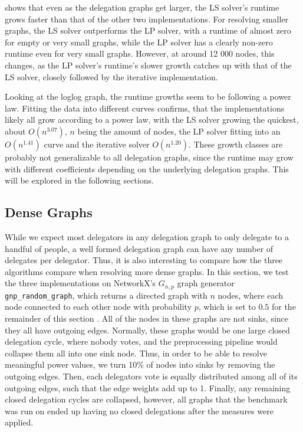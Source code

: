  shows that even as the delegation graphs get larger, the LS solver's runtime grows faster than that of the other two implementations. For resolving smaller graphs, the LS solver outperforms the LP solver, with a runtime of almost zero for empty or very small graphs, while the LP solver has a clearly non-zero runtime even for very small graphs. However, at around 12 000 nodes, this changes, as the LP solver's runtime's slower growth catches up with that of the LS solver, closely followed by the iterative implementation. 

Looking at the loglog graph, the runtime growths seem to be following a power law. Fitting the data into different curves confirms, that the implementations likely all grow according to a power law, with the LS solver growing the quickest, about $O(n^{3.07})$, $n$ being the amount of nodes, the LP solver fitting into an $O(n^{1.41})$ curve and the iterative solver $O(n^{1.20})$. These growth classes are probably not generalizable to all delegation graphs, since the runtime may grow with different coefficients depending on the underlying delegation graphs. This will be explored in the following sections.


\subsection{Dense Graphs}

While we expect most delegators in any delegation graph to only delegate to a handful of people, a well formed delegation graph can have any number of delegates per delegator. Thus, it is also interesting to compare how the three algorithms compare when resolving more dense graphs. In this section, we test the three implementations on NetworkX's $G_{n,p}$ graph generator \texttt{gnp\_random\_graph}, which returns a directed graph with $n$ nodes, where each node connected to each other node with probability $p$, which is set to $0.5$ for the remainder of this section \cite{hagbergExploringNetworkStructure2008}. All of the nodes in these graphs are not sinks, since they all have outgoing edges. Normally, these graphs would be one large closed delegation cycle, where nobody votes, and the preprocessing pipeline would collapse them all into one sink node. Thus, in order to be able to resolve meaningful power values, we turn 10\% of nodes into sinks by removing the outgoing edges. Then, each delegators vote is equally distributed among all of its outgoing edges, such that the edge weights add up to 1. Finally, any remaining closed delegation cycles are collapsed, however, all graphs that the benchmark was run on ended up having no closed delegations after the measures were applied.

